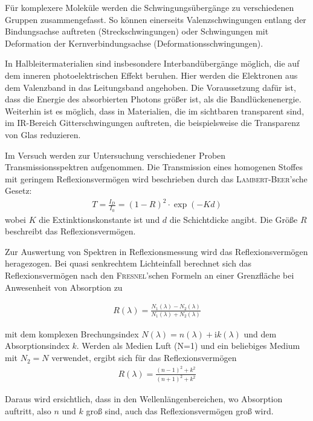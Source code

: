 \documentclass[a4paper,twoside,final]{article}
\begin{document}
Für komplexere Moleküle werden die Schwingungsübergänge zu verschiedenen Gruppen zusammengefasst. So können einerseits Valenzschwingungen entlang der Bindungsachse auftreten (Streckschwingungen) oder Schwingungen mit Deformation der Kernverbindungsachse (Deformationsschwingungen).

In Halbleitermaterialien sind insbesondere Interbandübergänge möglich, die auf dem inneren photoelektrischen Effekt beruhen. Hier werden die Elektronen aus dem Valenzband in das Leitungsband angehoben. Die Voraussetzung dafür ist, dass die Energie des absorbierten Photons größer ist, als die Bandlückenenergie. Weiterhin ist es möglich, dass in Materialien, die im sichtbaren transparent sind, im IR-Bereich Gitterschwingungen auftreten, die beispielsweise die Transparenz von Glas reduzieren.

Im Versuch werden zur Untersuchung verschiedener Proben Transmissionsspektren aufgenommen. Die Transmission eines homogenen Stoffes mit geringem Reflexionsvermögen wird beschrieben durch das \textsc{Lambert-Beer}'sche Gesetz:
\begin{align}
  T=\frac{I_D}{I_0}=(1-R)^2\cdot\exp(-Kd)
\end{align}
wobei $K$ die Extinktionskonstante ist und $d$ die Schichtdicke angibt. Die Größe $R$ beschreibt das Reflexionsvermögen.

Zur Auswertung von Spektren in Reflexionsmessung wird das Reflexionsvermögen heragezogen. Bei quasi senkrechtem Lichteinfall berechnet sich das Reflexionsvermögen nach den \textsc{Fresnel}'schen Formeln an einer Grenzfläche bei Anwesenheit von Absorption zu

\begin{align}
  R(\lambda)=\frac{N_1(\lambda)-N_2(\lambda)}{N_1(\lambda)+N_2(\lambda)}
\end{align}

mit dem komplexen Brechungsindex $N(\lambda) = n(\lambda)+\mathrm{i}k(\lambda)$  und dem Absorptionsindex $k$.
Werden als Medien Luft (N=1) und ein beliebiges Medium mit $N_2 = N$ verwendet, ergibt sich für das Reflexionsvermögen
\begin{align}
  R(\lambda)=\frac{(n-1)^2+k^2}{(n+1)^2+k^2}
\end{align}

Daraus wird ersichtlich, dass in den Wellenlängenbereichen, wo Absorption auftritt, also $n$ und $k$ groß sind, auch das Reflexionsvermögen groß wird.

\newpage
\end{document}
